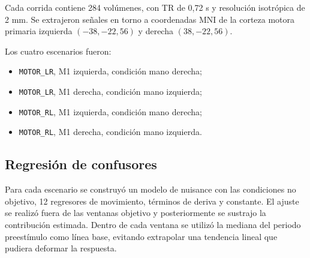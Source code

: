 Cada corrida contiene 284 volúmenes, con TR de 0,72 s y resolución isotrópica de 2 mm. Se extrajeron señales en torno a coordenadas MNI de la corteza motora primaria izquierda $(-38,-22,56)$ y derecha $(38,-22,56)$.

Los cuatro escenarios fueron:

\begin{itemize}
    \item \texttt{MOTOR\_LR}, M1 izquierda, condición mano derecha;
    \item \texttt{MOTOR\_LR}, M1 derecha, condición mano izquierda;
    \item \texttt{MOTOR\_RL}, M1 izquierda, condición mano derecha;
    \item \texttt{MOTOR\_RL}, M1 derecha, condición mano izquierda.
\end{itemize}

\subsection{Regresión de confusores}

Para cada escenario se construyó un modelo de nuisance con las condiciones no objetivo, 12 regresores de movimiento, términos de deriva y constante. El ajuste se realizó fuera de las ventanas objetivo y posteriormente se sustrajo la contribución estimada. Dentro de cada ventana se utilizó la mediana del periodo preestímulo como línea base, evitando extrapolar una tendencia lineal que pudiera deformar la respuesta.
